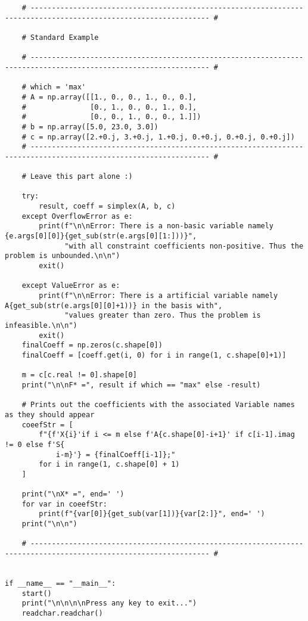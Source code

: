 \documentclass[letterpaper, a4paper]{article}
\begin{document}
\begin{verbatim}
    # ---------------------------------------------------------------------------------------------------------------- #

    # Standard Example

    # ---------------------------------------------------------------------------------------------------------------- #

    # which = 'max'
    # A = np.array([[1., 0., 0., 1., 0., 0.],
    #               [0., 1., 0., 0., 1., 0.],
    #               [0., 0., 1., 0., 0., 1.]])
    # b = np.array([5.0, 23.0, 3.0])
    # c = np.array([2.+0.j, 3.+0.j, 1.+0.j, 0.+0.j, 0.+0.j, 0.+0.j])
    # ---------------------------------------------------------------------------------------------------------------- #

    # Leave this part alone :)

    try:
        result, coeff = simplex(A, b, c)
    except OverflowError as e:
        print(f"\n\nError: There is a non-basic variable namely {e.args[0][0]}{get_sub(str(e.args[0][1:]))}",
              "with all constraint coefficients non-positive. Thus the problem is unbounded.\n\n")
        exit()

    except ValueError as e:
        print(f"\n\nError: There is a artificial variable namely A{get_sub(str(e.args[0][0]+1))} in the basis with",
              "values greater than zero. Thus the problem is infeasible.\n\n")
        exit()
    finalCoeff = np.zeros(c.shape[0])
    finalCoeff = [coeff.get(i, 0) for i in range(1, c.shape[0]+1)]

    m = c[c.real != 0].shape[0]
    print("\n\nF* =", result if which == "max" else -result)

    # Prints out the coefficients with the associated Variable names as they should appear
    coeefStr = [
        f"{f'X{i}'if i <= m else f'A{c.shape[0]-i+1}' if c[i-1].imag != 0 else f'S{
            i-m}'} = {finalCoeff[i-1]};"
        for i in range(1, c.shape[0] + 1)
    ]

    print("\nX* =", end=' ')
    for var in coeefStr:
        print(f"{var[0]}{get_sub(var[1])}{var[2:]}", end=' ')
    print("\n\n")

    # ---------------------------------------------------------------------------------------------------------------- #


if __name__ == "__main__":
    start()
    print("\n\n\n\nPress any key to exit...")
    readchar.readchar()


\end{verbatim}
\endgroup
\end{document}
